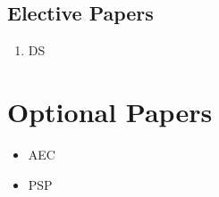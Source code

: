 \documentclass[a4paper]{article}
\begin{document}
\subsection {Elective Papers}
\begin{enumerate}
\item{DS}
\end{enumerate}
\section{Optional Papers}
\begin{itemize}
\item AEC
\item PSP
\end{itemize}
 
\end{document}
